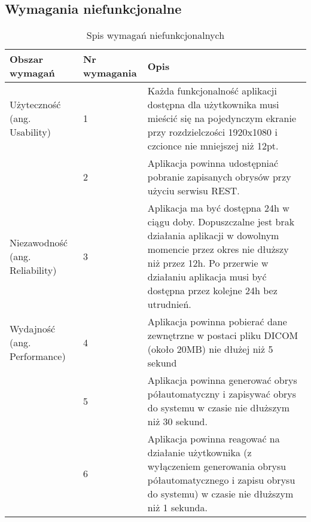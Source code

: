 \documentclass[a4paper,11pt,twoside]{report}
\theoremstyle{definition}
\begin{document}
\subsection {Wymagania niefunkcjonalne}


\begin{table}
\caption[Opis skrócony]{Spis wymagań niefunkcjonalnych}
\label{tabela wymagania niefunkcjonalne}
\centering
\begin{tabular}{ | p{} | p{} | p{} | }
\hline
  Obszar wymagań & Nr wymagania & Opis \\ \hline
  Użyteczność (ang. Usability) & 1 & Każda funkcjonalność aplikacji dostępna dla użytkownika musi mieścić się na pojedynczym ekranie przy rozdzielczości 1920x1080 i czcionce nie mniejszej niż 12pt. \\ 
  \cline{2-3}
    & 2 & Aplikacja powinna udostępniać pobranie zapisanych obrysów przy użyciu serwisu REST. \\ \hline
  Niezawodność (ang. Reliability) & 3 & Aplikacja ma być dostępna 24h w ciągu doby. Dopuszczalne jest brak działania aplikacji w dowolnym momencie przez okres nie dłuższy niż przez 12h. Po przerwie w działaniu aplikacja musi być dostępna przez kolejne 24h bez utrudnień. \\ \hline
  Wydajność (ang. Performance) & 4 & Aplikacja powinna pobierać dane zewnętrzne w postaci pliku DICOM (około 20MB) nie dłużej niż 5 sekund \\ 
  \cline{2-3}
  & 5 & Aplikacja powinna generować obrys półautomatyczny i zapisywać obrys do systemu w czasie nie dłuższym niż 30 sekund. \\ 
  \cline{2-3}
  & 6 & Aplikacja powinna reagować na działanie użytkownika (z wyłączeniem generowania obrysu półautomatycznego i zapisu obrysu do systemu) w czasie nie dłuższym niż 1 sekunda. \\
  \hline
\end{tabular}
\end{table}
\end{document}
